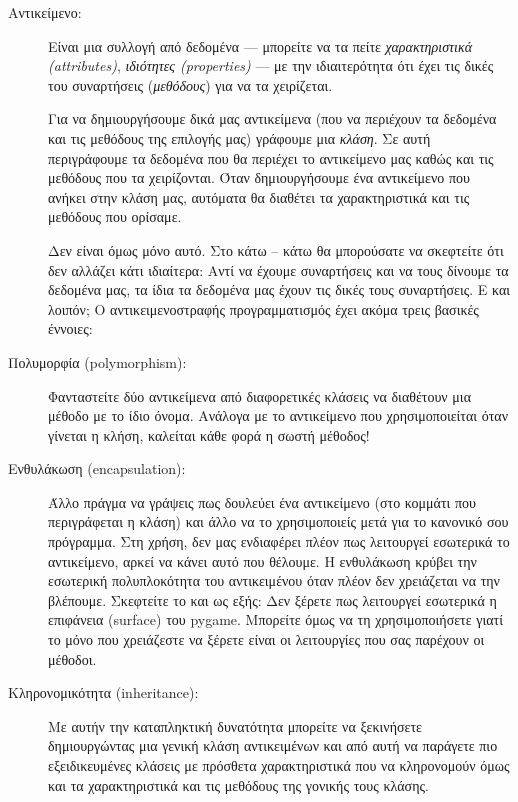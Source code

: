\begin{description}
 \item[Αντικείμενο:] Είναι μια συλλογή από δεδομένα --- μπορείτε
    να τα πείτε {\em χαρακτηριστικά (attributes)}, {\em ιδιότητες (properties)} --- με την
    ιδιαιτερότητα ότι έχει τις δικές του συναρτήσεις ({\em μεθόδους})
    για να τα χειρίζεται.

Για να δημιουργήσουμε  δικά μας αντικείμενα (που να περιέχουν τα
    δεδομένα και τις μεθόδους της επιλογής μας) γράφουμε μια
    {\em κλάση}. Σε αυτή περιγράφουμε τα δεδομένα που θα περιέχει
    το αντικείμενο μας καθώς και τις μεθόδους που τα χειρίζονται. Όταν
    δημιουργήσουμε ένα αντικείμενο που ανήκει στην κλάση μας, αυτόματα θα
    διαθέτει τα χαρακτηριστικά και τις μεθόδους που ορίσαμε.

Δεν είναι όμως μόνο αυτό. Στο κάτω -- κάτω θα μπορούσατε να σκεφτείτε ότι
    δεν αλλάζει κάτι ιδιαίτερα: Αντί να έχουμε συναρτήσεις και να τους δίνουμε
    τα δεδομένα μας, τα ίδια τα δεδομένα μας έχουν τις δικές τους συναρτήσεις.
    Ε και λοιπόν; Ο αντικειμενοστραφής προγραμματισμός έχει ακόμα τρεις
    βασικές έννοιες:

	 \item[Πολυμορφία (polymorphism):] Φανταστείτε δύο
	 αντικείμενα από διαφορετικές κλάσεις να διαθέτουν μια μέθοδο με το
	 ίδιο όνομα. Ανάλογα με το αντικείμενο που χρησιμοποιείται όταν
	 γίνεται η κλήση, καλείται κάθε φορά η σωστή μέθοδος!
	 \item[Ενθυλάκωση (encapsulation):] Άλλο πράγμα
	 να γράψεις πως δουλεύει ένα αντικείμενο (στο κομμάτι που περιγράφεται
	 η κλάση) και άλλο να το χρησιμοποιείς μετά για το κανονικό σου
	 πρόγραμμα. Στη χρήση, δεν μας ενδιαφέρει πλέον πως λειτουργεί
	 εσωτερικά το αντικείμενο, αρκεί να κάνει αυτό που θέλουμε. Η
	 ενθυλάκωση κρύβει την εσωτερική πολυπλοκότητα του αντικειμένου
	 όταν πλέον δεν χρειάζεται να την βλέπουμε. Σκεφτείτε το και ως εξής:
	 Δεν ξέρετε πως λειτουργεί εσωτερικά η επιφάνεια
	 (surface) του pygame. Μπορείτε όμως να τη χρησιμοποιήσετε
 	 γιατί το μόνο που χρειάζεστε να ξέρετε είναι οι λειτουργίες που
	 σας παρέχουν οι μέθοδοι.
	 \item[Κληρονομικότητα (inheritance):] Με αυτήν
	 την καταπληκτική δυνατότητα μπορείτε να ξεκινήσετε δημιουργώντας μια
	 γενική κλάση αντικειμένων και από αυτή να παράγετε πιο εξειδικευμένες
	 κλάσεις με πρόσθετα χαρακτηριστικά που να κληρονομούν όμως και τα
	 χαρακτηριστικά και τις μεθόδους της γονικής τους κλάσης.
\end{description}

